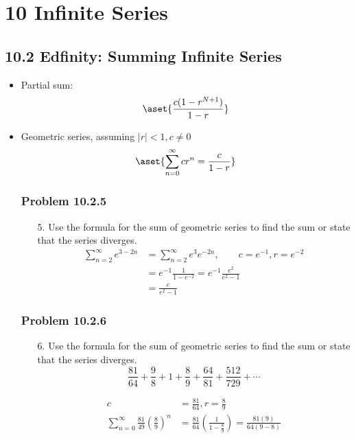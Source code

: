 \chapter{10 Infinite Series}

\section{10.2 Edfinity: Summing Infinite Series}
\begin{itemize}
  \item Partial sum:
    \[%
      \aset{\frac{c(1-r^{N+1})}{1-r}}
    \]%
  \item Geometric series, assuming \(|r| < 1, c \neq 0\)
    \[%
    \aset{\sum_{n=0}^{\infty} cr^n = \frac{c}{1-r}}
    \]%

  \subsection{Problem 10.2.5}
  \begin{itemize}
  \item[5.] Use the formula for the sum of geometric series to find the sum or
    state that the series diverges.
    \begin{align*}
      \sum_{n=2}^{\infty} e^{3-2n} &= \sum_{n=2}^{\infty} e^3 e^{-2n},\qquad
      c = e^{-1}, r = e^{-2} \\
      &= e^{-1} \frac{1}{1-e^{-2}} = e^{-1} \frac{e^2}{e^2-1} \\
      &= \frac{e}{e^2-1}
    \end{align*}
  \end{itemize}

  \subsection{Problem 10.2.6}
  \begin{itemize}
    \item[6.] Use the formula for the sum of geometric series to find the sum or
    state that the series diverges.
    \[%
    \frac{81}{64} + \frac{9}{8} + 1 + \frac{8}{9} + \frac{64}{81} + \frac{512}{729} + \cdots
    \]%

    \begin{align*}
      c &= \frac{81}{64}, r = \frac{8}{9} \\
      \sum_{n=0}^{\infty} \frac{81}{49}\left( \frac{8}{9} \right)^n &=
      \frac{81}{64}\left( \frac{1}{1-\frac{8}{9}} \right) =
      \frac{81(9)}{64(9-8)}
    \end{align*}
  \end{itemize}


\end{itemize}
